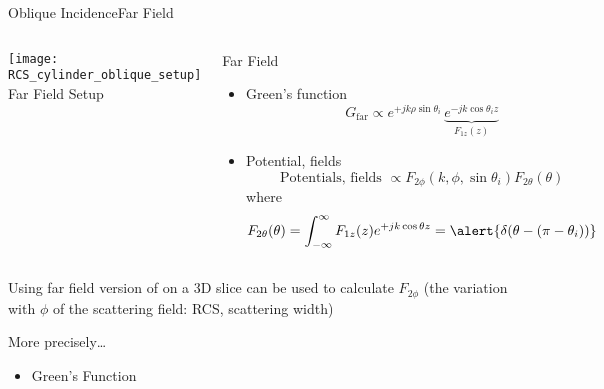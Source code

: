 \begin{frame}[allowframebreaks]{Oblique Incidence}{Far Field}

  \begin{columns}
     \centering
   \texttt{[image: RCS\_cylinder\_oblique\_setup]}
    \footnotesize{Far Field Setup}

    
     \centering
   \begin{block}{Far Field }
     \begin{itemize}
     \item Green's function
       \begin{equation*}
        G_\text{far} \propto
        e^{+j k \rho \sin\theta_i}\,
        \underbrace{ e^{-j k \cos\theta_i z}}_{F_{1z}(z)}
      \end{equation*}

    \item Potential, fields
      \begin{equation*}
        \text{Potentials, fields } \propto
        F_{2\phi}(k,\phi,\sin\theta_i) F_{2\theta}(\theta)
      \end{equation*}
      where
      \begin{equation*}
        F_{2\theta}(\theta) = \int_{-\infty}^\infty F_{1z}(z)e^{+j k \cos\theta z}
        = \alert{\delta(\theta-(\pi-\theta_i))}
      \end{equation*}
    \end{itemize}
    \end{block}

  \end{columns}

  \vspace{\baselineskip}
  
  \centering\parbox{0.9\linewidth}{\alert{Using far field version of {\GreenD} on a 3D
      slice can be used to calculate $F_{2\phi}$ (the variation
      with $\phi$ of the scattering field: RCS, scattering
      width)} %
  }


  \framebreak %
  
  \begin{block}{More precisely\ldots}
    \begin{itemize}
    \item Green's Function 


\end{itemize}
\end{block}
\end{frame}
